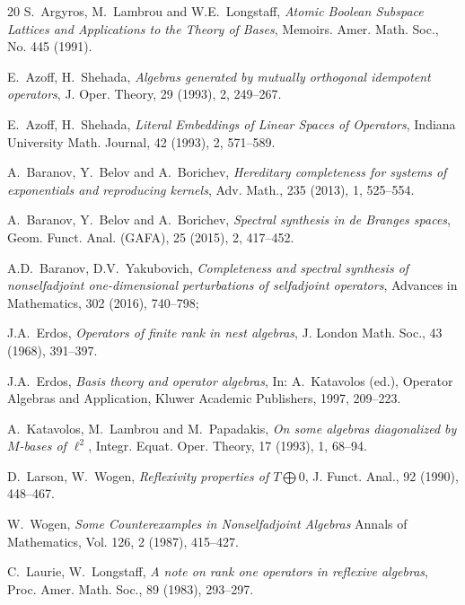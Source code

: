 \begin {thebibliography}{20}
    S.~\!Argyros, M.~\!Lambrou and W.E.~\!Longstaff,
    \emph{Atomic Boolean Subspace Lattices and Applications to the Theory of Bases},
    Memoirs. Amer. Math. Soc., No. 445 (1991).

    E.~\!Azoff, H.~\!Shehada,
    \emph{Algebras generated by mutually orthogonal idempotent operators},
    J. Oper. Theory, 29 (1993), 2, 249--267.

    E.~\!Azoff, H.~\!Shehada,
    \emph{Literal Embeddings of Linear Spaces of Operators},
    Indiana University Math. Journal, 42 (1993), 2, 571--589.


    A.~\!Baranov, Y.~\!Belov and A.~\!Borichev,
    \emph{Hereditary completeness for systems of exponentials and reproducing kernels},
    Adv. Math., 235 (2013), 1, 525--554.

    A.~\!Baranov, Y.~\!Belov and A.~\!Borichev,
    \emph{Spectral synthesis in de Branges spaces},
    Geom. Funct. Anal. (GAFA), 25 (2015), 2, 417--452.

    A.D.~\!Baranov, D.V.~\!Yakubovich,
    \emph{Completeness and spectral synthesis of nonselfadjoint one-dimensional
    perturbations of selfadjoint operators},
    Advances in Mathematics, 302 (2016), 740--798;

    J.A.~\!Erdos,
    \emph{Operators of finite rank in nest algebras},
    J. London Math. Soc., 43 (1968), 391--397.

    J.A.~\!Erdos,
    \emph{Basis theory and operator algebras},
    In: A.~\!Katavolos (ed.), Operator Algebras and Application, Kluwer Academic Publishers, 1997, 209--223.

    A.~\!Katavolos, M.~\!Lambrou and M.~\!Papadakis,
    \emph{On some algebras diagonalized by $M$-bases of $\ell^2$},
    Integr. Equat. Oper. Theory, 17 (1993), 1, 68--94.

    D.~\!Larson, W.~\!Wogen,
    \emph{Reflexivity properties of $T\bigoplus0$},
    J. Funct. Anal., 92 (1990), 448--467.

    W.~\!Wogen,
    \emph{Some Counterexamples in Nonselfadjoint Algebras}
    Annals of Mathematics, Vol. 126, 2 (1987), 415--427.
    

    C.~\!Laurie, W.~\!Longstaff,
    \emph{A note on rank one operators in reflexive algebras},
    Proc. Amer. Math. Soc., 89 (1983), 293--297.


\end{thebibliography}
